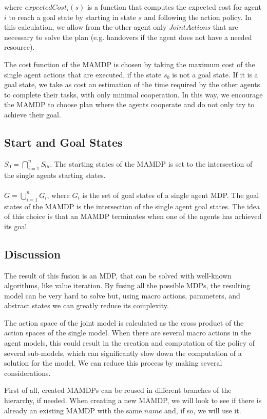 where $expectedCost_i(s)$ is a function that computes the expected cost for agent $i$ to reach a goal state by starting in state $s$ and following the action policy. In this calculation, we allow from the other agent only $JointActions$ that are necessary to solve the plan (e.g. handovers if the agent does not have a needed resource).

The cost function of the MAMDP is chosen by taking the maximum cost of the single agent actions that are executed, if the state $s_b$ is not a goal state. If it is a goal state, we take as cost an estimation of the time required by the other agents to complete their tasks, with only minimal cooperation. In this way, we encourage the MAMDP to choose plan where the agents cooperate and do not only try to achieve their goal.

\subsection{Start and Goal States}
$S_0=\bigcap_{i=1}^n S_{0i}$. The starting states of the MAMDP is set to the intersection of the single agents starting states.\\\\$G=\bigcup_{i=1}^n G_i $, where $G_i$ is the set of goal states of a single agent MDP. The goal states of the MAMDP is the intersection of the single agent goal states. The idea of this choice is that an MAMDP terminates when one of the agents has achieved its goal. 

\subsection{Discussion}
The result of this fusion is an MDP, that can be solved with well-known algorithms, like value iteration. By fusing all the possible MDPs, the resulting model can be  very hard to solve but, using macro actions, parameters, and abstract states we can greatly reduce its complexity. 

The action space of the joint model is calculated as the cross product of the action spaces of the single model. When there are several macro actions in the agent models, this could result in the creation and computation of the policy of several sub-models, which can significantly slow down the computation of a solution for the model. We can reduce this process by making several considerations.

First of all, created MAMDPs can be reused in different branches of the hierarchy, if needed. When creating a new MAMDP, we will look to see if there is already an existing MAMDP with the same $name$ and, if so, we will use it.

